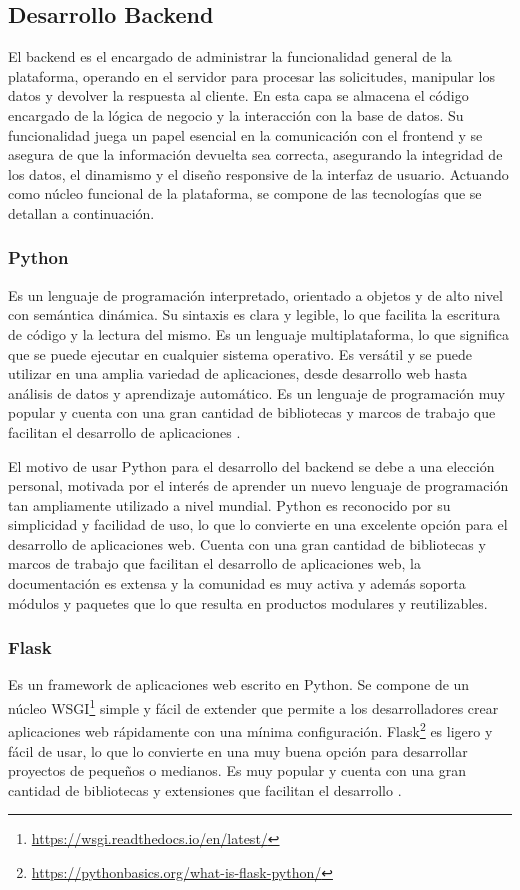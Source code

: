 \subsection{Desarrollo Backend}

El backend es el encargado de administrar la funcionalidad general de la plataforma, operando en el servidor para procesar las solicitudes, manipular los datos y devolver la respuesta al cliente. En esta capa se almacena el código encargado de la lógica de negocio y la interacción con la base de datos. Su funcionalidad juega un papel esencial en la comunicación con el frontend y se asegura de que la información devuelta sea correcta, asegurando la integridad de los datos, el dinamismo y el diseño responsive de la interfaz de usuario. Actuando como núcleo funcional de la plataforma, se compone de las tecnologías que se detallan a continuación.

\subsubsection*{Python}
Es un lenguaje de programación interpretado, orientado a objetos y de alto nivel con semántica dinámica. Su sintaxis es clara y legible, lo que facilita la escritura de código y la lectura del mismo. Es un lenguaje multiplataforma, lo que significa que se puede ejecutar en cualquier sistema operativo. Es versátil y se puede utilizar en una amplia variedad de aplicaciones, desde desarrollo web hasta análisis de datos y aprendizaje automático. Es un lenguaje de programación muy popular y cuenta con una gran cantidad de bibliotecas y marcos de trabajo que facilitan el desarrollo de aplicaciones \cite{python2021python}.\newline

El motivo de usar Python para el desarrollo del backend se debe a una elección personal, motivada por el interés de aprender un nuevo lenguaje de programación tan ampliamente utilizado a nivel mundial. Python es reconocido por su simplicidad y facilidad de uso, lo que lo convierte en una excelente opción para el desarrollo de aplicaciones web. Cuenta con una gran cantidad de bibliotecas y marcos de trabajo que facilitan el desarrollo de aplicaciones web, la documentación es extensa y la comunidad es muy activa y además soporta módulos y paquetes que lo que resulta en productos modulares y reutilizables.

\subsubsection*{Flask}
Es un framework de aplicaciones web escrito en Python. Se compone de un núcleo WSGI\footnote{\url{https://wsgi.readthedocs.io/en/latest/}} simple y fácil de extender que permite a los desarrolladores crear aplicaciones web rápidamente con una mínima configuración. Flask\footnote{\url{https://pythonbasics.org/what-is-flask-python/}} es ligero y fácil de usar, lo que lo convierte en una muy buena opción para desarrollar proyectos de pequeños o medianos. Es muy popular y cuenta con una gran cantidad de bibliotecas y extensiones que facilitan el desarrollo \cite{grinberg2018flask}.\newline

